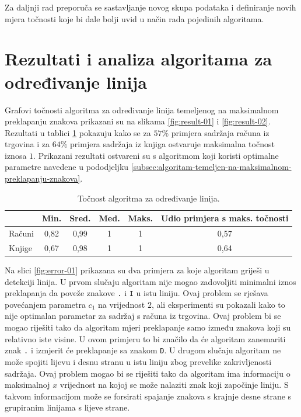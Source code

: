 \documentclass[times, utf8, zavrsni]{fer}
\begin{document}
Za daljnji rad preporuča se sastavljanje novog skupa podataka i definiranje
novih mjera točnosti koje bi dale bolji uvid u način rada pojedinih algoritama.

\pagebreak








\section{Rezultati i analiza algoritama za određivanje linija}
\label{sec:rezultati-i-analiza-algoritama-za-odredivanje-linija}
Grafovi točnosti algoritma za određivanje linija temeljenog na maksimalnom
preklapanju znakova prikazani su na slikama \ref{fig:result-01} i
\ref{fig:result-02}. Rezultati u tablici \ref{tbl:result-01} pokazuju kako se
za $57\%$ primjera sadržaja računa iz trgovina i za $64\%$ primjera sadržaja iz knjiga ostvaruje maksimalna
točnost iznosa $1$. Prikazani rezultati ostvareni su s algoritmom koji koristi
optimalne parametre navedene u pododjeljku
\ref{subsec:algoritam-temeljen-na-maksimalnom-preklapanju-znakova}.

\begin{table}[htb]
\caption{Točnost algoritma za određivanje linija.}
\label{tbl:result-01}
\centering
\begin{tabular}{lccccc} \hline
& Min. & Sred. & Med. & Maks. & Udio primjera s maks. točnosti \\ \hline
Računi & 0,82 & 0,99 & 1 & 1 & 0,57 \\
Knjige & 0,67 & 0,98 & 1 & 1 & 0,64 \\ \hline
\end{tabular}
\end{table}

Na slici \ref{fig:error-01} prikazana su dva primjera za koje algoritam griješi
u detekciji linija. U prvom slučaju algoritam nije mogao zadovoljiti minimalni
iznos preklapanja da poveže znakove \lstinline{.} i \lstinline{I} u istu
liniju. Ovaj problem se rješava povećanjem parametra $c_1$ na vrijednost $2$,
ali eksperimenti su pokazali kako to nije optimalan parametar za sadržaj s
računa iz trgovina. Ovaj problem bi se mogao riješiti tako da algoritam mjeri
preklapanje samo između znakova koji su relativno iste visine. U ovom primjeru
to bi značilo da će algoritam zanemariti znak \lstinline{.} i izmjerit će
preklapanje sa znakom \lstinline{D}. U drugom slučaju algoritam ne može spojiti
lijevu i desnu stranu u istu liniju zbog prevelike zakrivljenosti sadržaja.
Ovaj problem mogao bi se riješiti tako da algoritam ima informaciju o
maksimalnoj $x$ vrijednost na kojoj se može nalaziti znak koji započinje
liniju. S takvom informacijom može se forsirati spajanje znakova s krajnje
desne strane s grupiranim linijama s lijeve strane.
\end{document}
